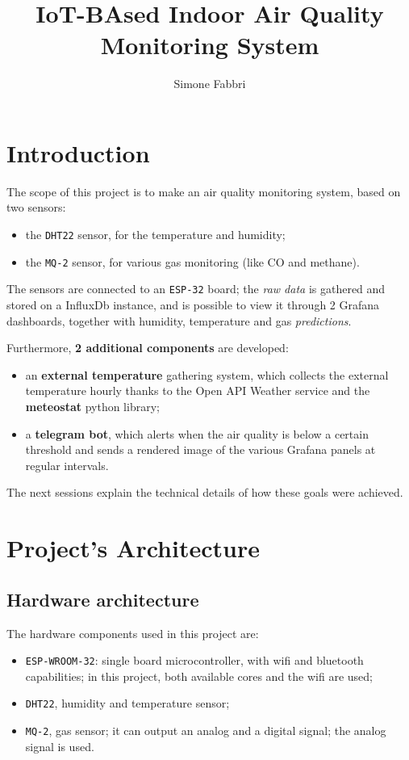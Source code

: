 \documentclass[]{article}
\title{IoT-BAsed Indoor Air Quality Monitoring System}
\author{Simone Fabbri}
\begin{document}
\maketitle

\section{Introduction}
The scope of this project is to make an air quality monitoring system, based on two sensors:
\begin{itemize}
	\item the \texttt{DHT22} sensor, for the temperature and humidity;
	\item the \texttt{MQ-2} sensor, for various gas monitoring (like CO and methane).
\end{itemize}

The sensors are connected to an \texttt{ESP-32} board; the \textit{raw data} is gathered and stored on a InfluxDb instance, and is possible to view it through 2 Grafana dashboards, together with humidity, temperature and gas \textit{predictions}. 

Furthermore, \textbf{2 additional components} are developed:
\begin{itemize}
	\item an \textbf{external temperature} gathering system, which collects the external temperature hourly thanks to the Open API Weather service and the \textbf{meteostat} python library;
	\item a \textbf{telegram bot}, which alerts when the air quality is below a certain threshold and sends a rendered image of the various Grafana panels at regular intervals.
\end{itemize}

The next sessions explain the technical details of how these goals were achieved.

\section{Project's Architecture}
\subsection{Hardware architecture}
The hardware components used in this project are:
\begin{itemize}
	\item \texttt{ESP-WROOM-32}: single board microcontroller, with wifi and bluetooth capabilities; in this project, both available cores and the wifi are used;
	\item \texttt{DHT22}, humidity and temperature sensor;
	\item \texttt{MQ-2}, gas sensor; it can output an analog and a digital signal; the analog signal is used. 
\end{itemize}
\end{document}
